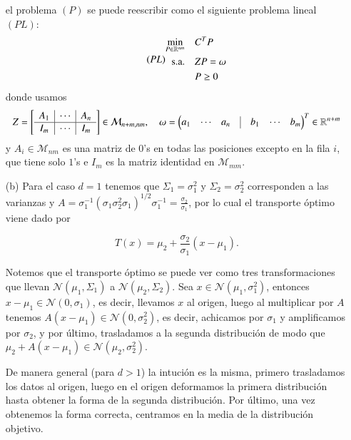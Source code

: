 \documentclass[
	spanish, %
	letterpaper, oneside
]{article}
\begin{document}
\begin{enumerate}
	el problema \((P)\) se puede reescribir como el siguiente problema lineal \((PL)\):
	\begin{equation}\tag{\(PL\)}
		\begin{aligned}
				\min_{P\in\mathbb{R}^{nm}} \quad & C^TP\\
				\textrm{s.a.} \quad & ZP=\omega\\
				& P\geq0
			\end{aligned}
	\end{equation}
	donde usamos
	\begin{equation*}
		Z=\left[\begin{array}{ c | c | c}
				A_1 & \cdots & A_n \\
				\hline
				I_m & \cdots & I_m
			\end{array}\right]\in\mathcal M_{n+m,nm},\quad\omega=\begin{pmatrix}a_1&\cdots&a_n&\vline  &b_1&\cdots &b_m\end{pmatrix}^T\in\R^{n+m}
	\end{equation*}
	y \(A_i\in\mathcal M_{nm}\) es una matriz de \(0\)'s en todas las posiciones excepto en la fila \(i\), que tiene solo \(1\)'s e \(I_m\) es la matriz identidad en \(\mathcal M_{mm}\).
	
	\item[(b)] Para el caso $d=1$ tenemos que $\Sigma_1=\sigma_1^2$ y $\Sigma_2=\sigma_2^2$ corresponden a las varianzas y $A=\sigma_1^{-1}\left(\sigma_1\sigma_2^2\sigma_1\right)^{1/2}\sigma_1^{-1}=\frac{\sigma_2}{\sigma_1}$, por lo cual el transporte óptimo viene dado por 
	
	$$T(x)=\mu_2+\frac{\sigma_2}{\sigma_1}(x-\mu_1).$$
	
	Notemos que el transporte óptimo se puede ver como tres transformaciones que llevan $\mathcal N(\mu_1,\Sigma_1)$ a $\mathcal N(\mu_2,\Sigma_2)$. Sea $x\in\mathcal N(\mu_1,\sigma_1^2)$, entonces $x-\mu_1\in\mathcal N(0,\sigma_1)$, es decir, llevamos $x$ al origen, luego al multiplicar por $A$ tenemos $A(x-\mu_1)\in\mathcal N(0,\sigma_2^2)$, es decir, achicamos por $\sigma_1$ y amplificamos por $\sigma_2$, y por último, trasladamos a la segunda distribución de modo que $\mu_2+A(x-\mu_1)\in\mathcal N(\mu_2,\sigma_2^2)$.
	
	De manera general (para $d>1$) la intución es la misma, primero trasladamos los datos al origen, luego en el origen deformamos la primera distribución hasta obtener la forma de la segunda distribución. Por último, una vez obtenemos la forma correcta, centramos en la media de la distribución objetivo.
	

\end{enumerate}
\end{document}
